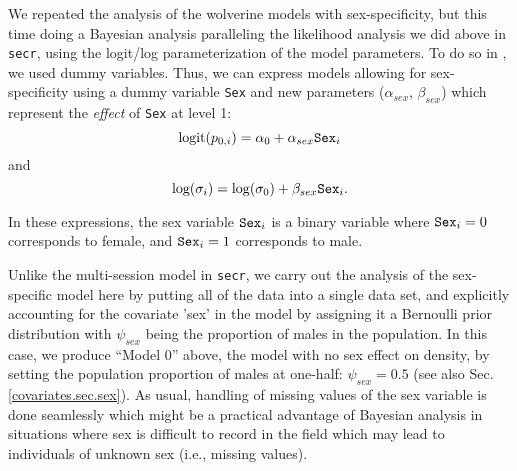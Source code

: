 We repeated the analysis of the wolverine models with sex-specificity,
but this time doing a Bayesian analysis paralleling the likelihood
analysis we did above in \mbox{\tt secr}, using the logit/log
parameterization of the model parameters.  To do so in \bugs, we 
used dummy variables.
Thus, we can express models allowing for sex-specificity
using a dummy variable \mbox{\tt Sex} and new parameters
($\alpha_{sex}$, $\beta_{sex}$) which
represent the {\it effect} of \mbox{\tt Sex} at level 1:
\[
 \mbox{logit}(p_{0,i}) = \alpha_{0} + \alpha_{sex} \mbox{\tt Sex}_{i}
\]
and
\[
 \mbox{log}(\sigma_{i}) = \log(\sigma_{0}) + \beta_{sex} \mbox{\tt Sex}_{i}.
\]

In these expressions, the sex variable $\mbox{\tt Sex}_{i}$ is a
binary variable where $\mbox{\tt Sex}_{i}= 0$ corresponds to female,
and $\mbox{\tt Sex}_{i} = 1$ corresponds to male. 

Unlike the multi-session model in \mbox{\tt secr}, we carry out the
analysis of the sex-specific model here by putting all of the data
into a single data set, and explicitly accounting for the covariate
'sex' in the model by assigning it a Bernoulli prior distribution with
$\psi_{sex}$ being the proportion of males in the population. In this
case, we produce ``Model 0'' above, the model with no sex effect on
density, by setting the population proportion of males at one-half: $\psi_{sex} = 0.5$
(see also Sec. \ref{covariates.sec.sex}).
As usual, handling of missing values
of the sex variable is done seamlessly which might be a practical
advantage of Bayesian analysis in situations where sex is difficult to
record in the field which may lead to individuals of unknown sex
(i.e., missing values).  

